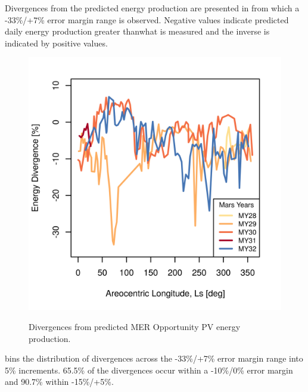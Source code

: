 


Divergences from the predicted energy production are presented in  from which a -33\%/+7\% error margin range is observed. Negative values indicate predicted daily energy production greater thanwhat is measured and the inverse is indicated by positive values.

\begin{figure}[h]
  \centering
  \hypersetup{linkcolor=captionTextColor}
  \includegraphics[width=0.5\linewidth]{sections/mars-solar-energy/photovoltaic-energy/plots/energy-prediction-divergences-from-my28-to-my32.png}\\
  \caption[Divergences from predicted \ac{MER} Opportunity \ac{PV} energy production]
          {Divergences from predicted \ac{MER} Opportunity \ac{PV} energy production.}
  \label{fig:plot:mer-energy-prediction-divergences}
\end{figure}

 bins the distribution of divergences across the -33\%/+7\% error margin range into 5\% increments. 65.5\% of the divergences occur within a -10\%/0\% error margin and 90.7\%  within -15\%/+5\%.

